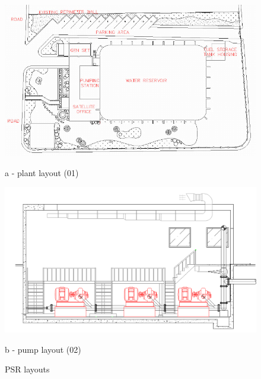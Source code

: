 \begin{figure}[!htb]
	\begin{minipage}[b]{0.4\linewidth}
		\centering
		\includegraphics[width=\textwidth]{figures/ch043_plant_layout}
		\caption*{a - plant layout (01)}
		\label{ch043_plant_layout}
	\end{minipage}
	\hspace{0.05cm}
	\begin{minipage}[b]{0.5\linewidth}
		\centering
		\includegraphics[width=\textwidth]{figures/ch043_pump_layout}
		\caption*{b - pump layout (02)}
		\label{ch043_pump_layout}
	\end{minipage}
\caption{PSR layouts}
\label{ch043_psr}
\end{figure}




